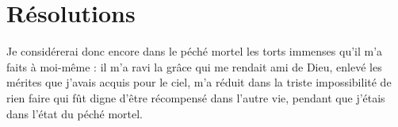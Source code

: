 \documentclass[instructions.tex]{subfiles}
\begin{document}
\section{Résolutions}

\primo Je considérerai donc encore dans le péché mortel les torts immenses qu’il m’a faits à moi-même : il m’a ravi la grâce qui me rendait ami de Dieu, enlevé les mérites que j’avais acquis pour le ciel, m’a réduit dans la triste impossibilité de rien faire qui fût digne d’être récompensé dans l’autre vie, pendant que j’étais dans l’état du péché mortel.

\end{document}
